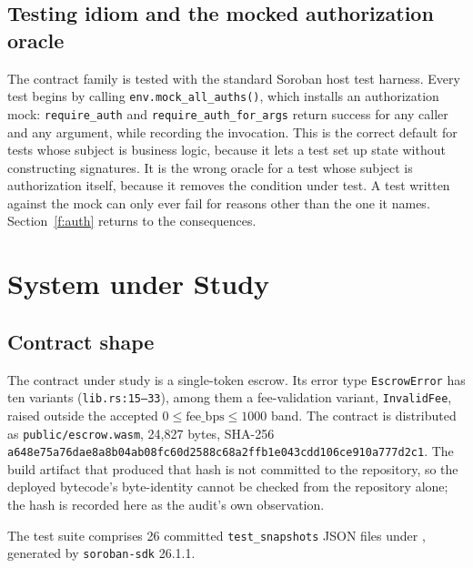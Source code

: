 \documentclass[sigconf,review]{acmart}
\begin{document}
\subsection{Testing idiom and the mocked authorization oracle}

The contract family is tested with the standard Soroban host test harness.
Every test begins by calling \texttt{env.mock\_all\_auths()}, which installs an
authorization mock: \texttt{require\_auth} and
\texttt{require\_auth\_for\_args} return success for any caller and any
argument, while recording the invocation. This is the correct default for tests
whose subject is business logic, because it lets a test set up state without
constructing signatures. It is the wrong oracle for a test whose subject is
authorization itself, because it removes the condition under test. A test
written against the mock can only ever fail for reasons other than the one it
names. Section~\ref{f:auth} returns to the consequences.

\section{System under Study}
\label{sec:system}

\subsection{Contract shape}

The contract under study is a single-token escrow. Its error type
\texttt{EscrowError} has ten variants (\texttt{lib.rs:15--33}), among them a
fee-validation variant, \texttt{InvalidFee}, raised outside the accepted
$0 \le \mathrm{fee\_bps} \le 1000$ band. The contract is distributed as
\texttt{public/escrow.wasm}, 24{,}827 bytes, SHA-256
\texttt{a648e75a76dae8a8b04ab08fc60d2588c68a2ffb1e043cdd106ce910a777d2c1}.
The build artifact that produced that hash is not committed to the repository,
so the deployed bytecode's byte-identity cannot be checked from the repository
alone; the hash is recorded here as the audit's own observation.

The test suite comprises 26 committed \texttt{test\_snapshots} JSON files under
, generated by
\texttt{soroban-sdk} 26.1.1.

\end{document}
